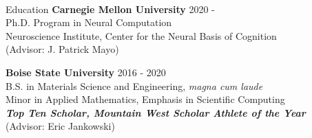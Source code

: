 \documentclass{resume} %
\begin{document}
\begin{center}
\vspace*{1mm} 
{\huge \href{https://github.com/kendranoneman}{\faGithub}}\hspace{3mm}
{\huge \href{https://www.linkedin.com/in/kendranoneman/}{\faLinkedinSquare}} \hspace{3mm}
{\huge \href{https://twitter.com/kendranoneman}{\faTwitter}} \hspace{3mm}
{\huge \href{https://www.mayolab.net}{\faFlask}
}\\
\end{center}

\begin{rSection}{Education}
{\bf Carnegie Mellon University} \hfill {2020 -} \\ 
Ph.D. Program in Neural Computation \\
Neuroscience Institute, Center for the Neural Basis of Cognition \\
(Advisor: J. Patrick Mayo) \smallskip 

{\bf Boise State University} \hfill {2016 - 2020} \\ 
B.S. in Materials Science and Engineering, \textit{magna cum laude} \\
Minor in Applied Mathematics, Emphasis in Scientific Computing \\
{\bf \textit{Top Ten Scholar, Mountain West Scholar Athlete of the Year}} \\ 
(Advisor: Eric Jankowski) \smallskip

\end{rSection}

\end{document}
